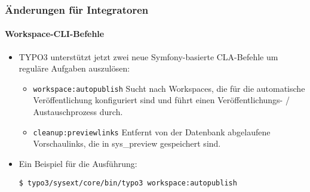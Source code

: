 
\begin{frame}[fragile]
	\frametitle{Änderungen für Integratoren}
	\framesubtitle{Workspace-CLI-Befehle}

	\lstset{basicstyle=\small\ttfamily}

	\begin{itemize}
		\item TYPO3 unterstützt jetzt zwei neue Symfony-basierte CLA-Befehle um reguläre
			Aufgaben auszulösen:

			\begin{itemize}

				\item \texttt{workspace:autopublish}\newline
					Sucht nach Workspaces, die für die automatische Veröffentlichung konfiguriert
					sind und führt einen Veröffentlichungs- / Austauschprozess durch.
					\newline

				\item \texttt{cleanup:previewlinks}\newline
					Entfernt von der Datenbank abgelaufene Vorschaulinks, die in sys\_preview
					gespeichert sind.

			\end{itemize}

		\item Ein Beispiel für die Ausführung:

			\begin{lstlisting}
$ typo3/sysext/core/bin/typo3 workspace:autopublish
			\end{lstlisting}

	\end{itemize}

\end{frame}


